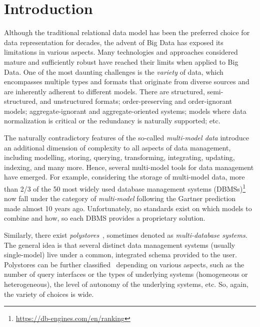 \section{Introduction}

Although the traditional relational data model has been the preferred choice for data representation for decades, the advent of Big Data has exposed its limitations in various aspects. Many technologies and approaches considered mature and sufficiently robust have reached their limits when applied to Big Data. One of the most daunting challenges is the \textit{variety} of data, which encompasses multiple types and formats that originate from diverse sources and are inherently adherent to different models. There are structured, semi-structured, and unstructured formats; order-preserving and order-ignorant models; aggregate-ignorant and aggregate-oriented systems; models where data normalization is critical or the redundancy is naturally supported; etc.

The naturally contradictory features of the so-called \textit{multi-model data} introduce an additional dimension of complexity to all aspects of data management, including modelling, storing, querying, transforming, integrating, updating, indexing, and many more. Hence, several multi-model tools for data management have emerged. For example, considering the storage of multi-model data, more than 2/3 of the 50 most widely used database management systems (DBMSs)\footnote{\url{https://db-engines.com/en/ranking}} now fall under the category of \textit{multi-model} following the Gartner prediction~\citep{Gartner2015} made almost 10 years ago. Unfortunately, no standards exist on which models to combine and how, so each DBMS provides a proprietary solution.

Similarly, there exist \textit{polystores}~\citep{conf/cikm/LuHC18,DBLP:journals/ijcc/BondiombouyV16}, sometimes denoted as \textit{multi-database systems}. The general idea is that several distinct data management systems (usually single-model) live under a common, integrated schema provided to the user. Polystores can be further classified~\citep{conf/bigdataconf/TanCGM17} depending on various aspects, such as the number of query interfaces or the types of underlying systems (homogeneous or heterogeneous), the level of autonomy of the underlying systems, etc. So, again, the variety of choices is wide.


